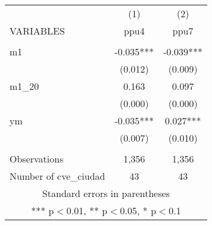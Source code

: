 \begin{tabular}{lcc} \hline
 & (1) & (2) \\
VARIABLES & ppu4 & ppu7 \\ \hline
 &  &  \\
m1 & -0.035*** & -0.039*** \\
 & (0.012) & (0.009) \\
m1\_20 & 0.163 & 0.097 \\
 & (0.000) & (0.000) \\
ym & -0.035*** & 0.027*** \\
 & (0.007) & (0.010) \\
 &  &  \\
Observations & 1,356 & 1,356 \\
 Number of cve\_ciudad & 43 & 43 \\ \hline
\multicolumn{3}{c}{ Standard errors in parentheses} \\
\multicolumn{3}{c}{ *** p$<$0.01, ** p$<$0.05, * p$<$0.1} \\
\end{tabular}

